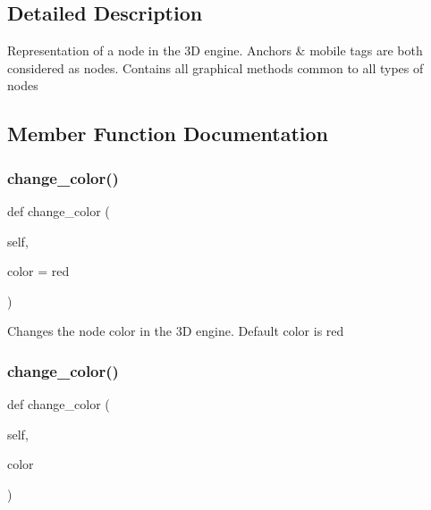 \subsection{Detailed Description}
\begin{DoxyVerb}Representation of a node in the 3D engine. Anchors & mobile tags are both considered as nodes.
Contains all graphical methods common to all types of nodes\end{DoxyVerb}
 

\subsection{Member Function Documentation}
\mbox{\label{class_rendering_1_1_rendered_node_a48d6e28dbdac1e5f35453b5dfc4eced3}} 
\subsubsection{\texorpdfstring{change\+\_\+color()}{change\_color()}\hspace{0.1cm}{\footnotesize\ttfamily [1/2]}}
{\footnotesize\ttfamily def change\+\_\+color (\begin{DoxyParamCaption}\item[{}]{self,  }\item[{}]{color = {\ttfamily \textquotesingle{}red\textquotesingle{}} }\end{DoxyParamCaption})}

\begin{DoxyVerb}Changes the node color in the 3D engine. Default color is red\end{DoxyVerb}
 \mbox{\label{class_rendering_1_1_rendered_node_a882efd96cadb1e70c9583217fa8725f0}} 
\subsubsection{\texorpdfstring{change\+\_\+color()}{change\_color()}\hspace{0.1cm}{\footnotesize\ttfamily [2/2]}}
{\footnotesize\ttfamily def change\+\_\+color (\begin{DoxyParamCaption}\item[{}]{self,  }\item[{}]{color }\end{DoxyParamCaption})}

